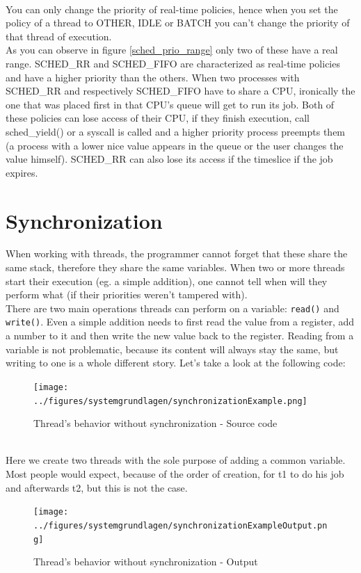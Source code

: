 \\
You can only change the priority of real-time policies, hence when you set the policy of a thread to OTHER, IDLE or BATCH you can't change the priority of that thread of execution.\\
As you can observe in figure \ref{sched_prio_range} only two of these have a \dq real\dq{} range.
SCHED\_RR and SCHED\_FIFO are characterized as real-time policies and have a higher priority than the
others. When two processes with SCHED\_RR and respectively SCHED\_FIFO have to share a CPU,
ironically the one that was placed first in that CPU's queue will get to run its job. Both of these
policies can lose access of their CPU, if they finish execution, call sched\_yield() or a syscall is called
and a higher priority process preempts them (a process with a lower nice value appears in the queue
or the user changes the value himself). SCHED\_RR can also lose its access if the timeslice if
the job expires.

\section{Synchronization}
When working with threads, the programmer cannot forget that these share the same stack, therefore they share the same variables. When two or more threads start their execution (eg. a simple addition), one cannot tell when will they perform what (if their priorities weren't tampered with).\\
There are two main operations threads can perform on a variable: \texttt{read()} and \texttt{write()}. Even a simple addition needs to first read the value from a register, add a number to it and then write the new value back to the register. Reading from a variable is not problematic, because its content will always stay the same, but writing to one is a whole different story. Let's take a look at the following code:
\begin{figure}[!htb]
	\centering
	\texttt{[image: ../figures/systemgrundlagen/synchronizationExample.png]}
	\caption{Thread's behavior without synchronization - Source code}
\end{figure}\\
\newpage
Here we create two threads with the sole purpose of adding a common variable. Most people would expect, because of the order of creation, for t1 to do his job and afterwards t2, but this is not the case.
\begin{figure}
	\texttt{[image: ../figures/systemgrundlagen/synchronizationExampleOutput.png]}
	\caption{Thread's behavior without synchronization - Output}
	\label{thread's_behavior}
\end{figure}


